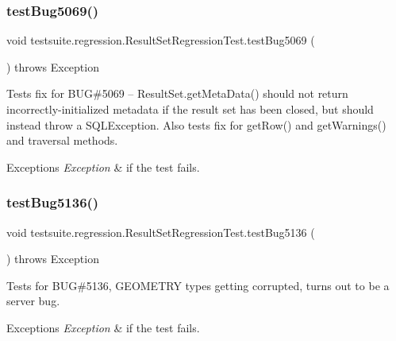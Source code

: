 \subsubsection{\texorpdfstring{test\+Bug5069()}{testBug5069()}}
{\footnotesize\ttfamily void testsuite.\+regression.\+Result\+Set\+Regression\+Test.\+test\+Bug5069 (\begin{DoxyParamCaption}{ }\end{DoxyParamCaption}) throws Exception}

Tests fix for B\+UG\#5069 -- Result\+Set.\+get\+Meta\+Data() should not return incorrectly-\/initialized metadata if the result set has been closed, but should instead throw a S\+Q\+L\+Exception. Also tests fix for get\+Row() and get\+Warnings() and traversal methods.


\begin{DoxyExceptions}{Exceptions}
{\em Exception} & if the test fails. \\
\hline
\end{DoxyExceptions}
\mbox{\label{classtestsuite_1_1regression_1_1_result_set_regression_test_a9f4b082f0411dbf1f533998671d080cd}} 
\subsubsection{\texorpdfstring{test\+Bug5136()}{testBug5136()}}
{\footnotesize\ttfamily void testsuite.\+regression.\+Result\+Set\+Regression\+Test.\+test\+Bug5136 (\begin{DoxyParamCaption}{ }\end{DoxyParamCaption}) throws Exception}

Tests for B\+UG\#5136, G\+E\+O\+M\+E\+T\+RY types getting corrupted, turns out to be a server bug.


\begin{DoxyExceptions}{Exceptions}
{\em Exception} & if the test fails. \\
\hline
\end{DoxyExceptions}
\mbox{\label{classtestsuite_1_1regression_1_1_result_set_regression_test_a67434549c3d855d48d611b6eff810242}} 
